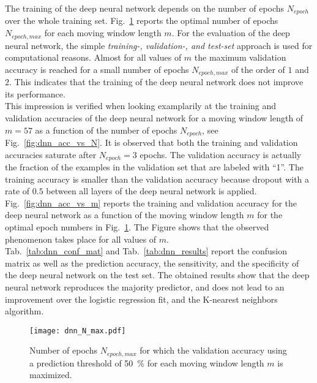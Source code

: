 The training of the deep neural network depends on the number of epochs $N_{epoch}$ over the whole training set. Fig.~\ref{fig:dnn_N_max} reports the optimal number of epochs $N_{epoch,max}$ for each moving window length $m$. For the evaluation of the deep neural network, the simple \textit{training-, validation-, and test-set} approach is used for computational reasons. Almost for all values of $m$ the maximum validation accuracy is reached for a small number of epochs $N_{epoch,max}$ of the order of $1$ and $2$. This indicates that the training of the deep neural network does not improve its performance.\\

This impression is verified when looking examplarily at the training and validation accuracies of the deep neural network for a moving window length of $m=57$ as a function of the number of epochs $N_{epoch}$, see Fig.~\ref{fig:dnn_acc_vs_N}. It is observed that both the training and validation accuracies saturate after $N_{epoch} = 3$ epochs. The validation accuracy is actually the fraction of the examples in the validation set that are labeled with \enquote{1}. The training accuracy is smaller than the validation accuracy because dropout with a rate of $0.5$ between all layers of the deep neural network is applied. \\

Fig.~\ref{fig:dnn_acc_vs_m} reports the training and validation accuracy for the deep neural network as a function of the moving window length $m$ for the optimal epoch numbers in Fig.~\ref{fig:dnn_N_max}. The Figure shows that the observed phenomenon takes place for all values of $m$. \\

Tab.~\ref{tab:dnn_conf_mat} and Tab.~\ref{tab:dnn_results} report the confusion matrix as well as the prediction accuracy, the sensitivity, and the specificity of the deep neural network on the test set. The obtained results show that the deep neural network reproduces the majority predictor, and does not lead to an improvement over the logistic regression fit, and the K-nearest neighbors algorithm.

\begin{figure}[h!]
  \centering
  \texttt{[image: dnn\_N\_max.pdf]}
  \caption{Number of epochs $N_{epoch,max}$ for which the validation accuracy using a prediction threshold of \SI{50}{\percent} for each moving window length $m$ is maximized.}
  \label{fig:dnn_N_max}
\end{figure}

